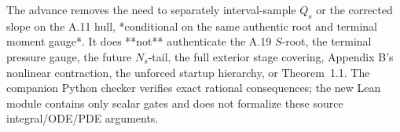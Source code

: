 The advance removes the need to separately interval-sample
\(Q_s\) or the corrected slope on the A.11 hull,
*conditional on the same authentic root and terminal moment
gauge*. It does **not** authenticate the A.19 \(S\)-root,
the terminal pressure gauge, the future \(N_s\)-tail,
the full exterior stage covering, Appendix B's nonlinear
contraction, the unforced startup hierarchy, or Theorem~1.1.
The companion Python checker verifies exact rational consequences;
the new Lean module contains only scalar gates and does not
formalize these source integral/ODE/PDE arguments.
